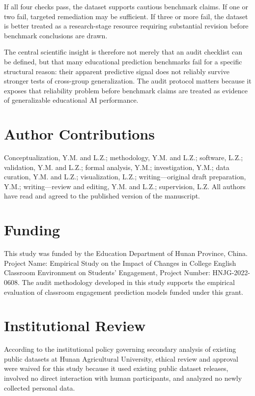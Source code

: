 \documentclass[10pt,letterpaper]{article}
\begin{document}
If all four checks pass, the dataset supports cautious benchmark claims. If one or two fail, targeted remediation may be sufficient. If three or more fail, the dataset is better treated as a research-stage resource requiring substantial revision before benchmark conclusions are drawn.

The central scientific insight is therefore not merely that an audit checklist can be defined, but that many educational prediction benchmarks fail for a specific structural reason: their apparent predictive signal does not reliably survive stronger tests of cross-group generalization. The audit protocol matters because it exposes that reliability problem before benchmark claims are treated as evidence of generalizable educational AI performance.

\section*{Author Contributions}
Conceptualization, Y.M. and L.Z.; methodology, Y.M. and L.Z.; software, L.Z.;
validation, Y.M. and L.Z.; formal analysis, Y.M.; investigation, Y.M.; data curation,
Y.M. and L.Z.; visualization, L.Z.; writing---original draft preparation, Y.M.;
writing---review and editing, Y.M. and L.Z.; supervision, L.Z. All authors have
read and agreed to the published version of the manuscript.

\section*{Funding}
This study was funded by the Education Department of Hunan Province, China.
Project Name: Empirical Study on the Impact of Changes in College English Classroom
Environment on Students' Engagement, Project Number: HNJG-2022-0608. The audit
methodology developed in this study supports the empirical evaluation of classroom
engagement prediction models funded under this grant.

\section*{Institutional Review}
According to the institutional policy governing secondary analysis of existing public
datasets at Hunan Agricultural University, ethical review and approval were waived for
this study because it used existing public dataset releases, involved no direct
interaction with human participants, and analyzed no newly collected personal data.
\end{document}
